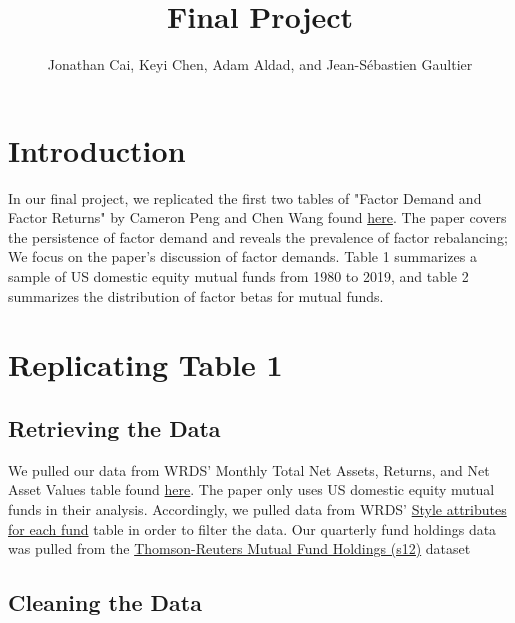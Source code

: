 \documentclass{article}
\title{Final Project}
\author{Jonathan Cai, Keyi Chen, Adam Aldad, and Jean-Sébastien Gaultier}
\begin{document}
\maketitle
 
\section{Introduction}

In our final project, we replicated the first two tables of "Factor Demand and Factor Returns" by Cameron Peng and Chen Wang 
found \href{https://papers.ssrn.com/sol3/papers.cfm?abstract_id=3327849}{here}. The paper covers the persistence of factor demand 
and reveals the prevalence of factor rebalancing; We focus on the paper's discussion of factor demands. Table 1 summarizes a sample
 of US domestic equity mutual funds from 1980 to 2019, and table 2 summarizes the distribution of factor betas for mutual funds. 

\section{Replicating Table 1}

\subsection{Retrieving the Data}


We pulled our data from WRDS' Monthly Total Net Assets, Returns, and Net Asset Values table
 found \href{https://wrds-www.wharton.upenn.edu/data-dictionary/crsp_q_mutualfunds/monthly_tna_ret_nav/}{here}. The paper 
 only uses US domestic equity mutual funds in their analysis. Accordingly, we pulled data
  from WRDS' \href{https://wrds-www.wharton.upenn.edu/data-dictionary/crsp_q_mutualfunds/fund_style/}{Style attributes for each fund} table in order to 
  filter the data. Our quarterly fund holdings data was pulled from 
  the \href{https://wrds-www.wharton.upenn.edu/data-dictionary/tr_mutualfunds/s12/}{Thomson-Reuters Mutual Fund Holdings (s12)} dataset

\subsection{Cleaning the Data}
\end{document}
